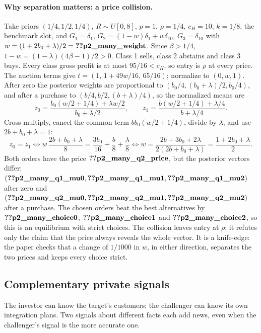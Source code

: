 \paragraph{Why separation matters: a price collision.}
Take priors \((1/4,1/2,1/4)\), \(R\sim U[0,8]\), \(p=1\), \(\rho=1/4\), \(c_H=10\), \(k=1/8\), the benchmark slot, and
\(G_1=\delta_1\), \(G_2=(1-w)\delta_1+w\delta_{10}\), \(G_3=\delta_{10}\) with \(w=(1+2b_0+\lambda)/2=\reg{p2_many_weight}\).
Since \(\beta>1/4\), \(1-w=(1-\lambda)(4\beta-1)/2>0\). Class 1 sells, class 2 abstains and class 3 buys. Every class
gross profit is at most \(95/16<c_H\), so entry is \(\rho\) at every price. The auction terms give
\(t=(1,\,1+49w/16,\,65/16)\); normalize to \((0,w,1)\). After zero the posterior weights are proportional to
\((b_0/4,(b_0+\lambda)/2,b_0/4)\), and after a purchase to \((b/4,b/2,(b+\lambda)/4)\), so the normalized means are
\[
z_0=\frac{b_0(w/2+1/4)+\lambda w/2}{b_0+\lambda/2},\qquad
z_1=\frac{b(w/2+1/4)+\lambda/4}{b+\lambda/4}.
\]
Cross-multiply, cancel the common term \(bb_0(w/2+1/4)\), divide by \(\lambda\), and use \(2b+b_0+\lambda=1\):
\[
z_0=z_1\iff w\,\frac{2b+b_0+\lambda}8=\frac{3b_0}{16}+\frac b8+\frac\lambda8
\iff w=\frac{2b+3b_0+2\lambda}{2(2b+b_0+\lambda)}=\frac{1+2b_0+\lambda}2 .
\]
Both orders have the price \(\reg{p2_many_q2_price}\), but the posterior vectors differ:
\((\reg{p2_many_q1_mu0},\reg{p2_many_q1_mu1},\reg{p2_many_q1_mu2})\) after zero and
\((\reg{p2_many_q2_mu0},\reg{p2_many_q2_mu1},\reg{p2_many_q2_mu2})\) after a purchase. The chosen orders beat the best
alternatives by \(\reg{p2_many_choice0}\), \(\reg{p2_many_choice1}\) and \(\reg{p2_many_choice2}\), so this is an
equilibrium with strict choices. The collision leaves entry at \(\rho\); it refutes only the claim that the price
always reveals the whole vector. It is a knife-edge: the paper checks that a change of \(1/1000\) in \(w\), in either direction, separates the two prices and keeps every choice strict.

\subsection{Complementary private signals}\label{sec:10_robustness-signals}

\begin{intuition}
The investor can know the target's customers; the challenger can know its own integration plans. Two signals about
different facts each add news, even when the challenger's signal is the more accurate one.
\end{intuition}

